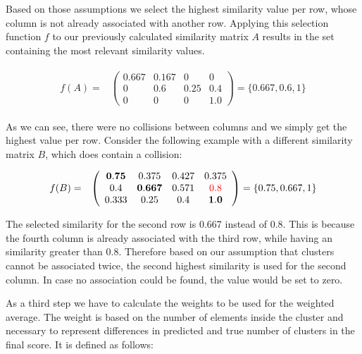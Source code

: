 Based on those assumptions we select the highest similarity value per row,
whose column is not already associated with another row.
Applying this selection function $f$ to our previously calculated similarity matrix $A$
results in the set containing the most relevant similarity values.

\begin{gather*}
    \begin{array}{rcl}
        f(A) = & \left(\begin{array}{cccc}
            \mathbf{0.667} & 0.167 & 0 & 0 \\
            0 & \mathbf{0.6} & 0.25 & 0.4 \\
            0 &  0 & 0 & \mathbf{1.0} \end{array}\right)
            = \{0.667, 0.6, 1\}
    \end{array}
\end{gather*}

As we can see, there were no collisions between columns and we simply get the highest value per row.
Consider the following example with a different similarity matrix $B$, which does contain a collision:

\begin{gather*}
    \begin{array}{rcl}
        f(B) = & \left(\begin{array}{cccc}
            \mathbf{0.75} & 0.375 & 0.427 & 0.375 \\
            0.4 & \mathbf{0.667} & 0.571 & \textcolor{red}{0.8} \\
            0.333 &  0.25 & 0.4 & \mathbf{1.0} \end{array}\right)
            = \{0.75, 0.667, 1\}
    \end{array}
\end{gather*}

The selected similarity for the second row is 0.667 instead of 0.8.
This is because the fourth column is already associated with the third row, while having an similarity greater than 0.8.
Therefore based on our assumption that clusters cannot be associated twice,
the second highest similarity is used for the second column.
In case no association could be found, the value would be set to zero.

As a third step we have to calculate the weights to be used for the weighted average.
The weight is based on the number of elements inside the cluster
and necessary to represent differences in predicted and true number of clusters in the final score.
It is defined as follows:

